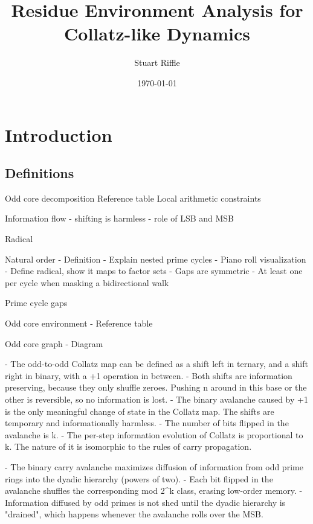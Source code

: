 \documentclass[12pt]{article}
\title{Residue Environment Analysis for Collatz-like Dynamics}
\author{Stuart Riffle}
\date{\today}
\theoremstyle{plain}
\theoremstyle{definition}
\begin{document}
\maketitle
\begin{abstract}
\end{abstract}

\section{Introduction}
    \subsection{Definitions}





Odd core decomposition
Reference table 
Local arithmetic constraints



Information flow
- shifting is harmless
- role of LSB and MSB


Radical 

Natural order
- Definition
- Explain nested prime cycles
- Piano roll visualization
- Define radical, show it maps to factor sets
- Gaps are symmetric
- At least one per cycle when masking a bidirectional walk




Prime cycle gaps

Odd core environment
- Reference table

Odd core graph
- Diagram


\newpage


- The odd-to-odd Collatz map can be defined as a shift left in ternary, and a shift right in binary, with a +1 operation in between.
- Both shifts are information preserving, because they only shuffle zeroes. Pushing n around in this base or the other is reversible, so no information is lost.
- The binary avalanche caused by +1 is the only meaningful change of state in the Collatz map. The shifts are temporary and informationally harmless.
- The number of bits flipped in the avalanche is k.
- The per-step information evolution of Collatz is proportional to k. The nature of it is isomorphic to the rules of carry propagation.

- The binary carry avalanche maximizes diffusion of information from odd prime rings into the dyadic hierarchy (powers of two).
- Each bit flipped in the avalanche shuffles the corresponding mod 2^k class, erasing low-order memory.
- Information diffused by odd primes is not shed until the dyadic hierarchy is "drained", which happens whenever the avalanche rolls over the MSB.
\end{document}
